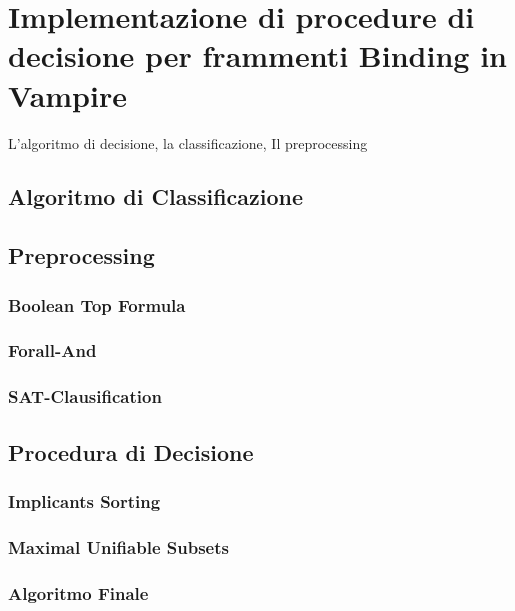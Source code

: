 \documentclass[./main.tex]{subfiles}
\begin{document}
\chapter{Implementazione di procedure di decisione per frammenti Binding in Vampire}
L'algoritmo di decisione, la classificazione, Il preprocessing
\section{Algoritmo di Classificazione}

\section{Preprocessing}
\subsection{Boolean Top Formula}
\subsection{Forall-And}
\subsection{SAT-Clausification}

\section{Procedura di Decisione}
\subsection{Implicants Sorting}
\subsection{Maximal Unifiable Subsets}
\subsection{Algoritmo Finale}
\end{document}
